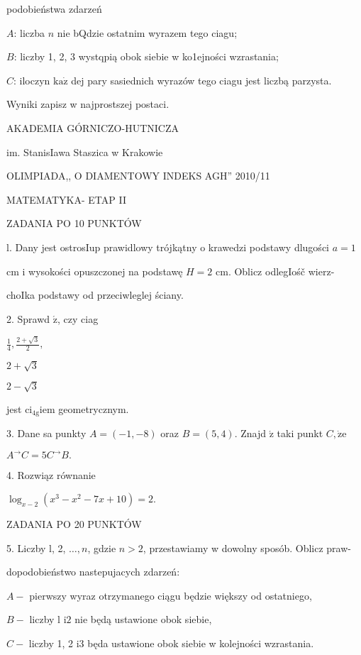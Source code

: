 \documentclass[a4paper,12pt]{article}
\begin{document}
podobieństwa zdarzeń

$A$: liczba $n$ nie bQdzie ostatnim wyrazem tego ciagu;

$B$: liczby 1, 2, 3 wystqpią obok siebie w ko1ejności wzrastania;

$C$: iloczyn $\mathrm{k}\mathrm{a}\dot{\mathrm{z}}$ dej pary sasiednich wyrazów tego ciagu jest liczbą parzysta.

Wyniki zapisz w najprostszej postaci.






AKADEMIA GÓRNICZO-HUTNICZA

im. StanisIawa Staszica w Krakowie

OLIMPIADA,, O DIAMENTOWY INDEKS AGH'' 2010/11

MATEMATYKA- ETAP II

ZADANIA PO 10 PUNKTÓW

l. Dany jest ostrosIup prawidlowy trójkątny o krawedzi podstawy dlugości $a=1$

cm i wysokości opuszczonej na podstawę $H=2$ cm. Oblicz odlegIośč wierz-

choIka podstawy od przeciwleglej ściany.

2. Sprawd $\acute{\mathrm{z}}$, czy ciag

$\displaystyle \frac{1}{4}, \displaystyle \frac{2+\sqrt{3}}{2},$

$2+\sqrt{3}$

$2-\sqrt{3}$

jest $\mathrm{c}\mathrm{i}_{4\mathrm{g}}\mathrm{i}\mathrm{e}\mathrm{m}$ geometrycznym.

3. Dane sa punkty $A=(-1,-8)$ oraz $B=(5,4).$ Znajd $\acute{\mathrm{z}}$ taki punkt $C, \dot{\mathrm{z}}\mathrm{e}$

$A^{\rightarrow}C=5C^{\rightarrow}B.$

4. Rozwiąz równanie

$\log_{x-2}(x^{3}-x^{2}-7x+10)=2.$

ZADANIA PO 20 PUNKTÓW

5. Liczby l, 2, $\ldots, n$, gdzie $n>2$, przestawiamy w dowolny sposób. Oblicz praw-

dopodobieństwo nastepujacych zdarzeń:

$A-$ pierwszy wyraz otrzymanego ciągu będzie większy od ostatniego,

$B-$ liczby l $\mathrm{i}2$ nie będą ustawione obok siebie,

$C-$ liczby 1, 2 $\mathrm{i}3$ będa ustawione obok siebie w kolejności wzrastania.
\end{document}
